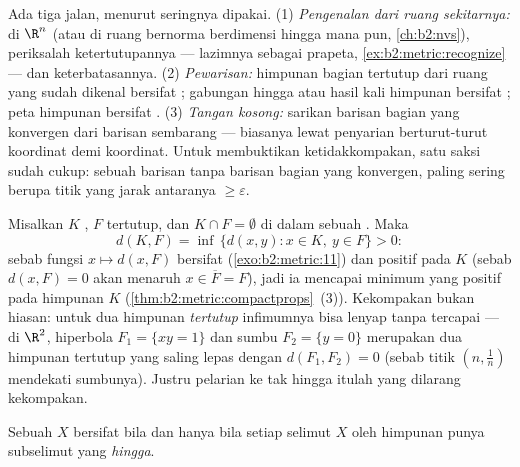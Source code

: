 \begin{method}\label{met:b2:metric:compactness}
Ada tiga jalan, menurut seringnya dipakai. (1) \emph{Pengenalan dari
ruang sekitarnya:} di $\R^n$ (atau di ruang bernorma berdimensi hingga
mana pun, \cref{ch:b2:nvs}), periksalah ketertutupannya --- lazimnya
sebagai prapeta, \cref{ex:b2:metric:recognize} --- dan keterbatasannya. (2)
\emph{Pewarisan:} himpunan bagian tertutup dari ruang  yang sudah
dikenal bersifat ; gabungan hingga atau hasil kali himpunan 
bersifat ; peta  himpunan  bersifat . (3)
\emph{Tangan kosong:} sarikan barisan bagian yang konvergen dari barisan
sembarang --- biasanya lewat penyarian berturut-turut koordinat demi
koordinat. Untuk membuktikan ketidakkompakan, satu saksi sudah cukup:
sebuah barisan tanpa barisan bagian yang konvergen, paling sering berupa
titik yang jarak antaranya $\geq \varepsilon$.
\end{method}

\begin{example}\label{ex:b2:metric:setdistance}
Misalkan $K$ , $F$ tertutup, dan $K \cap F = \emptyset$ di dalam
sebuah . Maka
\[
d(K, F) = \inf\,\{d(x, y) : x \in K,\ y \in F\} > 0 :
\]
sebab fungsi $x \mapsto d(x, F)$ bersifat 
(\cref{exo:b2:metric:11}) dan positif pada $K$ (sebab $d(x, F) = 0$
akan menaruh $x \in \overline F = F$), jadi ia mencapai minimum yang
positif pada himpunan  $K$
(\cref{thm:b2:metric:compactprops}~(3)). Kekompakan bukan
hiasan: untuk dua himpunan \emph{tertutup} infimumnya bisa lenyap
tanpa tercapai --- di $\R^2$, hiperbola $F_1 = \{xy
= 1\}$ dan sumbu $F_2 = \{y = 0\}$ merupakan dua himpunan tertutup yang
saling lepas dengan $d(F_1, F_2) = 0$ (sebab titik $(n, \frac1n)$
mendekati sumbunya). Justru pelarian ke tak hingga itulah yang dilarang kekompakan.
\end{example}

\begin{theorem}\label{thm:b2:metric:borellebesgue}
Sebuah  $X$ bersifat  bila dan hanya bila setiap
selimut $X$ oleh himpunan  punya subselimut yang
\emph{hingga}.
\end{theorem}

